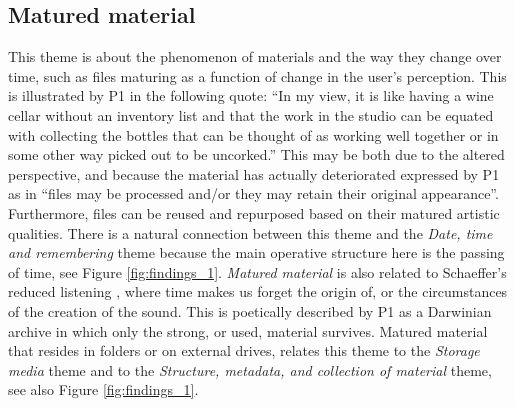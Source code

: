 \documentclass[runningheads,a4paper]{cmmr2023}
\begin{document}
\subsection{Matured material}
\label{sec:matured}
This theme is about the phenomenon of materials and the way they change over time, such as files maturing as a function of change in the user's perception. This is illustrated by P1 in the following quote: “In my view, it is like having a wine cellar without an inventory list and that the work in the studio can be equated with collecting the bottles that can be thought of as working well together or in some other way picked out to be uncorked.” This may be both due to the altered perspective, and because the material has actually deteriorated expressed by P1 as in “files may be processed and/or they may retain their original appearance”. Furthermore, files can be reused and repurposed based on their matured artistic qualities. There is a natural connection between this theme and the \emph{Date, time and remembering} theme because the main operative structure here is the passing of time, see Figure \ref{fig:findings_1}. \emph{Matured material} is also related to Schaeffer's reduced listening \cite{Kane2014}, where time makes us forget the origin of, or the circumstances of the creation of the sound. This is poetically described by P1 as a Darwinian archive in which only the strong, or used, material survives. Matured material that resides in folders or on external drives, relates this theme to the \emph{Storage media} theme and to the \emph{Structure, metadata, and collection of material} theme, see also Figure \ref{fig:findings_1}.
\end{document}
